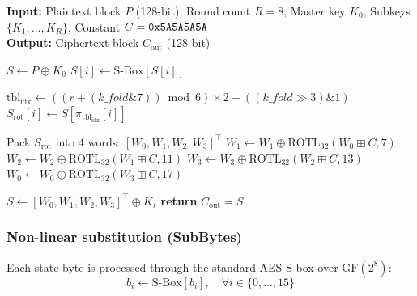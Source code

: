 \documentclass[10pt,twocolumn]{article}
\begin{document}
\begin{algorithm}[htbp]
\caption{Rubik-4D encryption pipeline.}
\label{alg:rubik4d_enc}
\textbf{Input:} Plaintext block $P$ (128-bit), Round count $R=8$, Master key $K_0$, Subkeys $\{K_1, \dots, K_R\}$, Constant $C = \text{\texttt{0x5A5A5A5A}}$ \\
\textbf{Output:} Ciphertext block $C_{\text{out}}$ (128-bit)
\begin{algorithmic}[1]
\STATE {}
\STATE $S \leftarrow P \oplus K_0$
\STATE {}
    \STATE {}
        \STATE $S[i] \leftarrow \text{S-Box}[S[i]]$
    \ENDFOR
    
    \STATE {}
    \STATE $\text{tbl}_{\text{idx}} \leftarrow \left( (r + (\mathit{k\_fold} \mathbin{\&} 7)) \bmod 6 \right) \times 2 + ((\mathit{k\_fold} \gg 3) \mathbin{\&} 1)$
        \STATE $S_{\text{rot}}[i] \leftarrow S[\pi_{\text{tbl}_{\text{idx}}}[i]]$
    \ENDFOR
    
    \STATE {}
    \STATE Pack $S_{\text{rot}}$ into 4 words: $[W_0, W_1, W_2, W_3]^\top$
    \STATE $W_1 \leftarrow W_1 \oplus \text{ROTL}_{32}(W_0 \boxplus C, 7)$
    \STATE $W_2 \leftarrow W_2 \oplus \text{ROTL}_{32}(W_1 \boxplus C, 11)$
    \STATE $W_3 \leftarrow W_3 \oplus \text{ROTL}_{32}(W_2 \boxplus C, 13)$
    \STATE $W_0 \leftarrow W_0 \oplus \text{ROTL}_{32}(W_3 \boxplus C, 17)$
    
    \STATE {}
    \STATE $S \leftarrow [W_0, W_1, W_2, W_3]^\top \oplus K_r$
\ENDFOR
\STATE {}
\STATE \textbf{return} $C_{\text{out}} = S$
\end{algorithmic}
\end{algorithm}

\subsubsection{Non-linear substitution (SubBytes)}
Each state byte is processed through the standard AES S-box over $\text{GF}(2^8)$:
\begin{equation}
    b_i \leftarrow \text{S-Box}[b_i], \quad \forall i \in \{0, \dots, 15\}
\end{equation}
\end{document}

